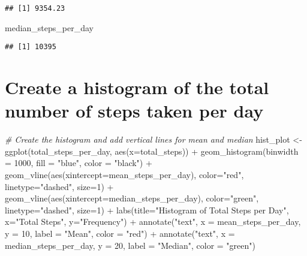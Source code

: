 \documentclass[
]{article}
\newenvironment{Shaded}{\begin{snugshade}}{\end{snugshade}}
\newcommand{\AttributeTok}[1]{\textcolor[rgb]{0.77,0.63,0.00}{#1}}
\newcommand{\CommentTok}[1]{\textcolor[rgb]{0.56,0.35,0.01}{\textit{#1}}}
\newcommand{\DecValTok}[1]{\textcolor[rgb]{0.00,0.00,0.81}{#1}}
\newcommand{\FunctionTok}[1]{\textcolor[rgb]{0.00,0.00,0.00}{#1}}
\newcommand{\NormalTok}[1]{#1}
\newcommand{\OtherTok}[1]{\textcolor[rgb]{0.56,0.35,0.01}{#1}}
\newcommand{\SpecialCharTok}[1]{\textcolor[rgb]{0.00,0.00,0.00}{#1}}
\newcommand{\StringTok}[1]{\textcolor[rgb]{0.31,0.60,0.02}{#1}}
\begin{document}
\begin{verbatim}
## [1] 9354.23
\end{verbatim}

\begin{Shaded}
\begin{Highlighting}[]
\NormalTok{median\_steps\_per\_day}
\end{Highlighting}
\end{Shaded}

\begin{verbatim}
## [1] 10395
\end{verbatim}

\hypertarget{create-a-histogram-of-the-total-number-of-steps-taken-per-day}{%
\section{Create a histogram of the total number of steps taken per
day}\label{create-a-histogram-of-the-total-number-of-steps-taken-per-day}}

\begin{Shaded}
\begin{Highlighting}[]
\CommentTok{\# Create the histogram and add vertical lines for mean and median}
\NormalTok{hist\_plot }\OtherTok{\textless{}{-}} \FunctionTok{ggplot}\NormalTok{(total\_steps\_per\_day, }\FunctionTok{aes}\NormalTok{(}\AttributeTok{x=}\NormalTok{total\_steps)) }\SpecialCharTok{+}
  \FunctionTok{geom\_histogram}\NormalTok{(}\AttributeTok{binwidth =} \DecValTok{1000}\NormalTok{, }\AttributeTok{fill =} \StringTok{"blue"}\NormalTok{, }\AttributeTok{color =} \StringTok{"black"}\NormalTok{) }\SpecialCharTok{+}
  \FunctionTok{geom\_vline}\NormalTok{(}\FunctionTok{aes}\NormalTok{(}\AttributeTok{xintercept=}\NormalTok{mean\_steps\_per\_day), }\AttributeTok{color=}\StringTok{"red"}\NormalTok{, }\AttributeTok{linetype=}\StringTok{"dashed"}\NormalTok{, }\AttributeTok{size=}\DecValTok{1}\NormalTok{) }\SpecialCharTok{+}
  \FunctionTok{geom\_vline}\NormalTok{(}\FunctionTok{aes}\NormalTok{(}\AttributeTok{xintercept=}\NormalTok{median\_steps\_per\_day), }\AttributeTok{color=}\StringTok{"green"}\NormalTok{, }\AttributeTok{linetype=}\StringTok{"dashed"}\NormalTok{, }\AttributeTok{size=}\DecValTok{1}\NormalTok{) }\SpecialCharTok{+}
  \FunctionTok{labs}\NormalTok{(}\AttributeTok{title=}\StringTok{"Histogram of Total Steps per Day"}\NormalTok{, }\AttributeTok{x=}\StringTok{"Total Steps"}\NormalTok{, }\AttributeTok{y=}\StringTok{"Frequency"}\NormalTok{) }\SpecialCharTok{+}
  \FunctionTok{annotate}\NormalTok{(}\StringTok{"text"}\NormalTok{, }\AttributeTok{x =}\NormalTok{ mean\_steps\_per\_day, }\AttributeTok{y =} \DecValTok{10}\NormalTok{, }\AttributeTok{label =} \StringTok{"Mean"}\NormalTok{, }\AttributeTok{color =} \StringTok{"red"}\NormalTok{) }\SpecialCharTok{+}
  \FunctionTok{annotate}\NormalTok{(}\StringTok{"text"}\NormalTok{, }\AttributeTok{x =}\NormalTok{ median\_steps\_per\_day, }\AttributeTok{y =} \DecValTok{20}\NormalTok{, }\AttributeTok{label =} \StringTok{"Median"}\NormalTok{, }\AttributeTok{color =} \StringTok{"green"}\NormalTok{)}
\end{Highlighting}
\end{Shaded}
\end{document}
